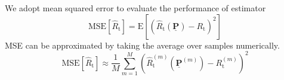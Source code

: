 We adopt mean squared error to evaluate the performance of estimator
\begin{equation} \label{equation:MSE}
\mathrm{MSE} \left[ \hat{R}_{\mathrm{t}} \right]
= \mathrm{E} \left[ \left(
\hat{R}_{\mathrm{t}} \left( \underline{\mathbf{P}} \right)
- R_{\mathrm{t}} \right)^2 \right] 
\end{equation}
MSE can be approximated by taking the average over samples numerically.
\begin{equation} \label{equation:EmpiricalMSE}
\mathrm{MSE} \left[ \hat{R}_{\mathrm{t}} \right]
\approx \frac{1}{M} \sum_{m=1}^M \left(
\hat{R}_{\mathrm{t}}^{(m)} \left( \underline{\mathbf{P}}^{(m)} \right)
- R_{\mathrm{t}}^{(m)} \right)^2 
\end{equation}

